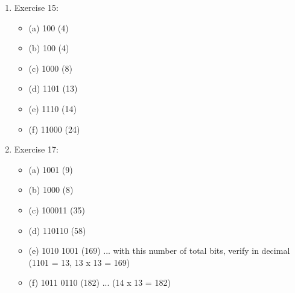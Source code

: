 \documentclass[10pt]{article}
\begin{document}
\begin{enumerate}
\item Exercise 15:
\begin{itemize}
\item (a) 100 (4)
\item (b) 100 (4)
\item (c) 1000 (8)
\item (d) 1101 (13)
\item (e) 1110 (14)
\item (f) 11000 (24)
\end{itemize}
\item Exercise 17:
\begin{itemize}
\item (a) 1001 (9)
\item (b) 1000 (8)
\item (c) 100011 (35)
\item (d) 110110 (58)
\item (e) 1010 1001 (169) ... with this number of total bits, verify in decimal (1101 = 13, 13 x 13 = 169)
\item (f) 1011 0110 (182) ... (14 x 13 = 182)
\end{itemize}
\end{enumerate}
\end{document}
